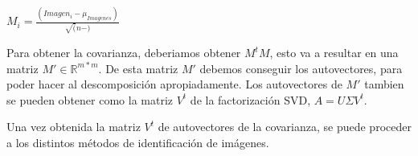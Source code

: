 $M_i = \frac{(Imagen_i - \mu_{Imagenes})}{\sqrt(n-)}$

Para obtener la covarianza, deberiamos obtener $M^t M$, esto va a resultar en una matriz $M' \in \mathbb{R}^{m * m}$.
De esta matriz $M'$ debemos conseguir los autovectores, para poder hacer al descomposici\'on apropiadamente.
Los autovectores de $M'$ tambien se pueden obtener como la matriz $V^t$ de la factorizaci\'on SVD, $A=U\Sigma V^t$.

Una vez obtenida la matriz $V^t$ de autovectores de la covarianza, se puede proceder a los distintos m\'etodos de
identificaci\'on de im\'agenes.
